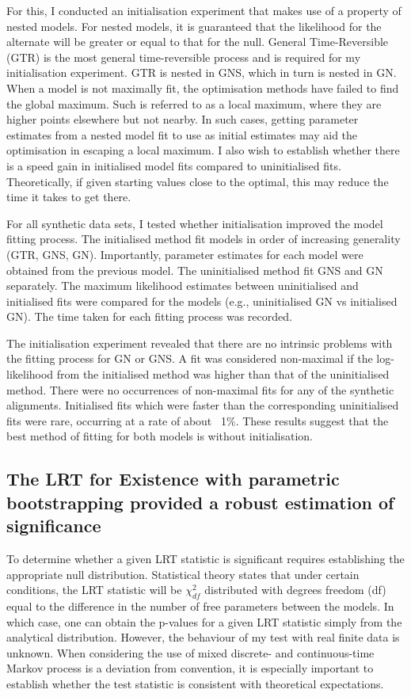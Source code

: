 For this, I conducted an initialisation experiment that makes use of a property of nested models. For nested models, it is guaranteed that the likelihood for the alternate will be greater or equal to that for the null. General Time-Reversible (GTR) is the most general time-reversible process and is required for my initialisation experiment. GTR is nested in GNS, which in turn is nested in GN. When a model is not maximally fit, the optimisation methods have failed to find the global maximum. Such is referred to as a local maximum, where they are higher points elsewhere but not nearby. In such cases, getting parameter estimates from a nested model fit to use as initial estimates may aid the optimisation in escaping a local maximum. I also wish to establish whether there is a speed gain in initialised model fits compared to uninitialised fits. Theoretically, if given starting values close to the optimal, this may reduce the time it takes to get there. 

For all synthetic data sets, I tested whether initialisation improved the model fitting process. The initialised method fit models in order of increasing generality (GTR, GNS, GN). Importantly, parameter estimates for each model were obtained from the previous model. The uninitialised method fit GNS and GN separately. The maximum likelihood estimates between uninitialised and initialised fits were compared for the models (e.g., uninitialised GN vs initialised GN). The time taken for each fitting process was recorded.  

The initialisation experiment revealed that there are no intrinsic problems with the fitting process for GN or GNS. A fit was considered non-maximal if the log-likelihood from the initialised method was higher than that of the uninitialised method. There were no occurrences of non-maximal fits for any of the synthetic alignments. Initialised fits which were faster than the corresponding uninitialised fits were rare, occurring at a rate of about ~1\%. These results suggest that the best method of fitting for both models is without initialisation.

\subsection*{The LRT for Existence with parametric bootstrapping provided a robust estimation of significance}

To determine whether a given LRT statistic is significant requires establishing the appropriate null distribution. Statistical theory states that under certain conditions, the LRT statistic will be $\chi^2_{df}$ distributed with degrees freedom (df) equal to the difference in the number of free parameters between the models. In which case, one can obtain the p-values for a given LRT statistic simply from the analytical distribution. However, the behaviour of my test with real finite data is unknown. When considering the use of mixed discrete- and continuous-time Markov process is a deviation from convention, it is especially important to establish whether the test statistic is consistent with theoretical expectations. 

